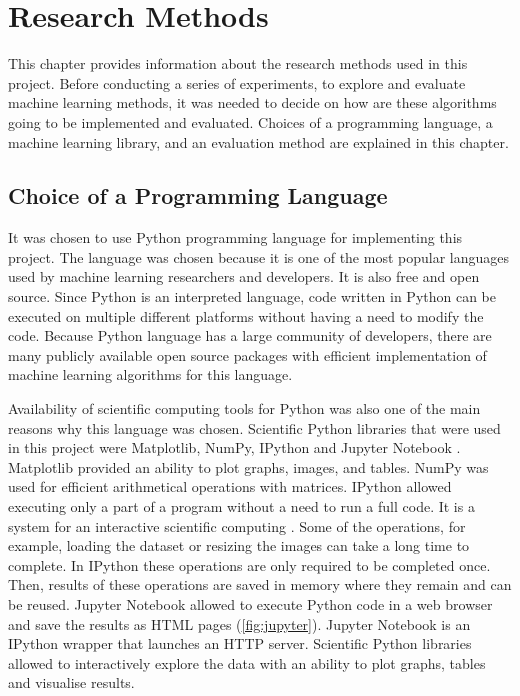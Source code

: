 \chapter{Research Methods}

This chapter provides information about the research methods used in this project. Before conducting a series of experiments, to explore and evaluate machine learning methods, it was needed to decide on how are these algorithms going to be implemented and evaluated. Choices of a programming language,  a machine learning library, and an evaluation method are explained in this chapter.

\section{Choice of a Programming Language}

 It was chosen to use Python programming language for implementing this project. The language was chosen because it is one of the most popular languages used by machine learning researchers and developers. It is also free and open source. Since Python is an interpreted language, code written in Python can be executed on multiple different platforms without having a need to modify the code. Because  Python language has a large community of developers, there are many publicly available open source packages with efficient implementation of machine learning algorithms for this language.

Availability of scientific computing tools for Python was also one of the main reasons why this language was chosen. Scientific Python libraries that were used in this project were Matplotlib, NumPy, IPython and Jupyter Notebook \citep{scipy}. Matplotlib provided an ability to plot graphs, images, and tables. NumPy was used for efficient arithmetical operations with matrices. IPython allowed executing only a part of a program without a need to run a full code. It is a system for an interactive scientific computing \citep{ipython}. Some of the operations, for example, loading the dataset or resizing the images can take a long time to complete. In IPython these operations are only required to be completed once. Then, results of these operations are saved in memory where they remain and can be reused. Jupyter Notebook allowed to execute Python code in a web browser and save the results as HTML pages (\autoref{fig:jupyter}). Jupyter Notebook is an IPython wrapper that launches an HTTP server. Scientific Python libraries allowed to interactively explore the data with an ability to plot graphs, tables and visualise results.

